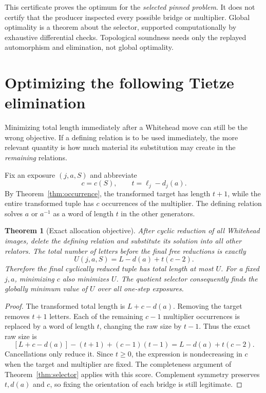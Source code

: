 \documentclass[11pt,letterpaper]{article}
\newtheorem{theorem}{Theorem}[section]
\theoremstyle{definition}\newtheorem{definition}[theorem]{Definition}
\begin{document}
This certificate proves the optimum for the \emph{selected pinned problem}. It does not certify that the producer inspected every possible bridge or multiplier. Global optimality is a theorem about the selector, supported computationally by exhaustive differential checks. Topological soundness needs only the replayed automorphism and elimination, not global optimality.

\section{Optimizing the following Tietze elimination}\label{sec:allocation}
Minimizing total length immediately after a Whitehead move can still be the wrong objective. If a defining relation is to be used immediately, the more relevant quantity is how much material its substitution may create in the \emph{remaining} relations.

Fix an exposure $(j,a,S)$ and abbreviate
\[
 c=c(S),\qquad t=\ell_j-d_j(a).
\]
By Theorem~\ref{thm:occurrence}, the transformed target has length $t+1$, while the entire transformed tuple has $c$ occurrences of the multiplier. The defining relation solves $a$ or $a^{-1}$ as a word of length $t$ in the other generators.

\begin{theorem}[Exact allocation objective]\label{thm:allocation}
After cyclic reduction of all Whitehead images, delete the defining relation and substitute its solution into all other relators. The total number of letters before the final free reductions is exactly
\begin{equation}\label{eq:allocation}
 U(j,a,S)=L-d(a)+t(c-2).
\end{equation}
Therefore the final cyclically reduced tuple has total length at most $U$. For a fixed $j,a$, minimizing $c$ also minimizes $U$. The quotient selector consequently finds the globally minimum value of $U$ over all one-step exposures.
\end{theorem}
\begin{proof}
The transformed total length is $L+c-d(a)$. Removing the target removes $t+1$ letters. Each of the remaining $c-1$ multiplier occurrences is replaced by a word of length $t$, changing the raw size by $t-1$. Thus the exact raw size is
\[
 [L+c-d(a)]-(t+1)+(c-1)(t-1)=L-d(a)+t(c-2).
\]
Cancellations only reduce it. Since $t\ge0$, the expression is nondecreasing in $c$ when the target and multiplier are fixed. The completeness argument of Theorem~\ref{thm:selector} applies with this score. Complement symmetry preserves $t,d(a)$ and $c$, so fixing the orientation of each bridge is still legitimate.
\end{proof}
\end{document}
